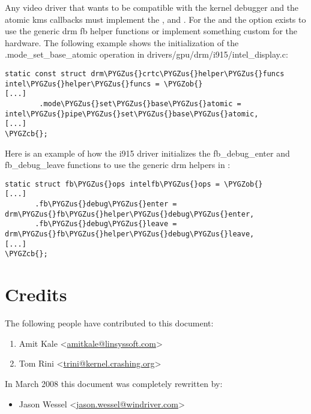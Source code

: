 \documentclass[a4paper,8pt,english]{sphinxmanual}
\def\PYGZus{\char`\_}
\def\PYGZob{\char`\{}
\def\PYGZcb{\char`\}}
\begin{document}
Any video driver that wants to be compatible with the kernel debugger
and the atomic kms callbacks must implement the ,
 and . For the
 and  the option exists to use the
generic drm fb helper functions or implement something custom for the
hardware. The following example shows the initialization of the
.mode\_set\_base\_atomic operation in
drivers/gpu/drm/i915/intel\_display.c:

\begin{Verbatim}[commandchars=\\\{\}]
static const struct drm\PYGZus{}crtc\PYGZus{}helper\PYGZus{}funcs intel\PYGZus{}helper\PYGZus{}funcs = \PYGZob{}
[...]
        .mode\PYGZus{}set\PYGZus{}base\PYGZus{}atomic = intel\PYGZus{}pipe\PYGZus{}set\PYGZus{}base\PYGZus{}atomic,
[...]
\PYGZcb{};
\end{Verbatim}

Here is an example of how the i915 driver initializes the
fb\_debug\_enter and fb\_debug\_leave functions to use the generic drm
helpers in :

\begin{Verbatim}[commandchars=\\\{\}]
static struct fb\PYGZus{}ops intelfb\PYGZus{}ops = \PYGZob{}
[...]
       .fb\PYGZus{}debug\PYGZus{}enter = drm\PYGZus{}fb\PYGZus{}helper\PYGZus{}debug\PYGZus{}enter,
       .fb\PYGZus{}debug\PYGZus{}leave = drm\PYGZus{}fb\PYGZus{}helper\PYGZus{}debug\PYGZus{}leave,
[...]
\PYGZcb{};
\end{Verbatim}


\section{Credits}
\label{dev-tools/kgdb:credits}
The following people have contributed to this document:
\begin{enumerate}
\item {} 
Amit Kale \textless{}\href{mailto:amitkale@linsyssoft.com}{amitkale@linsyssoft.com}\textgreater{}

\item {} 
Tom Rini \textless{}\href{mailto:trini@kernel.crashing.org}{trini@kernel.crashing.org}\textgreater{}

\end{enumerate}

In March 2008 this document was completely rewritten by:
\begin{itemize}
\item {} 
Jason Wessel \textless{}\href{mailto:jason.wessel@windriver.com}{jason.wessel@windriver.com}\textgreater{}

\end{itemize}
\end{document}
